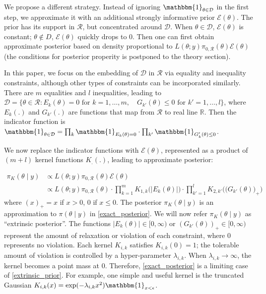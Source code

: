 \documentclass[10pt]{article}
\newcommand{\mc}[1]{\mathcal{#1}}
\begin{document}
We propose a different strategy. Instead of ignoring $\mathbbm{1}_{\theta\in \mc D} $ in the first step, we approximate it with an additional strongly informative prior $\mc E(\theta)$. The prior has its support in $\mc R$, but concentrated around $\mc D$. When $\theta \in \mc D$, $\mc E(\theta)$ is constant; $\theta \not\in D$, $\mc E(\theta)$ quickly drops to $0$. Then one can first obtain approximate posterior based on density proportional to $L(\theta;y)\pi_{0,\mc R}(\theta)\mc E(\theta)$ (the conditions for posterior properity is postponed to the theory section).

In this paper, we focus on the embedding of $\mc D$ in $\mc R$ via equality and inequality constraints, although other types of constraints can be incorporated similarly. There are $m$ equalities and $l$ inequalities, leading to $\mc D = \{ \theta \in \mc R: E_k(\theta)=0 \text{ for } k=1,\ldots,m, \quad G_{k'}(\theta)\le 0  \text{ for } k'=1,\ldots,l \}$, where $E_k(.)$ and $G_{k'}(.)$ are functions that map from $\mc R$ to real line $\mathbb R$. Then the indicator function is $\mathbbm{1}_{\theta\in \mc D} = \prod_k \mathbbm{1}_{E_k(\theta)=0} \cdot \prod_{k'}\mathbbm{1}_{G_k'(\theta)\le 0}$.


We now replace the indicator functions with $\mc E(\theta)$, represented as a product of $(m+l)$ kernel functions $K_.(.)$, leading to approximate posterior:

\begin{equation}
\begin{aligned}
\label{extrinsic_prior}
\pi_{K}(\theta \mid y) & \propto L(\theta;y)\pi_{0,\mc R}(\theta) \mc E(\theta) \\
&\propto L(\theta;y)\pi_{0,\mc R}(\theta) \cdot \prod_{k=1}^{m} K_{1,k}\Big( | E_k(\theta)| \Big) \cdot \prod_{k'=1}^{l} K_{2,k'}\Big( \big( G_{k'}(\theta) \big)_+ \Big)
\end{aligned}
\end{equation}
where $(x)_+ = x$ if $x>0$, $0$ if $x\le 0$. The posterior $\pi_{K}(\theta \mid y)$ is an approximation to $\pi(\theta \mid y)$ in \eqref{exact_posterior}. We will now refer $\pi_{K}(\theta \mid y)$ as ``extrinsic posterior''. The functions $|E_k(\theta)|\in [0,\infty)$ or $(G_{k'}(\theta))_+ \in [0,\infty)$ represent the amount of relaxation or violation of each constraint, where $0$ represents no violation. Each kernel $K_{i,k}$ satisfies $K_{i,k}(0)=1$; the tolerable amount of violation is controlled by a hyper-parameter $\lambda_{i,k}$. When $\lambda_{i,k} \rightarrow \infty$, the kernel becomes a point mass at $0$. Therefore, \eqref{exact_posterior} is a limiting case of \eqref{extrinsic_prior}. For example, one simple and useful kernel is the truncated Gaussian $K_{i,k}(x) = \exp( -{\lambda_{i,k} x^2}) \mathbbm{1}_{x<\epsilon}$.
\end{document}
